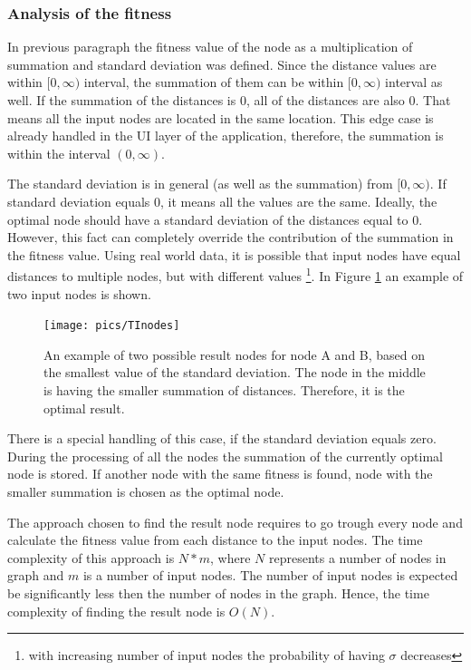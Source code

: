 \documentclass[thesis=M,english]{FITthesis}[2012/10/20]
\begin{document}
\subsubsection{Analysis of the fitness}
In previous paragraph the fitness value of the node as a multiplication of summation and standard deviation was defined. Since the distance values are within $[0, \infty)$ interval, the summation of them can be within $[0, \infty)$ interval as well. If the summation of the distances is $0$, all of the distances are also $0$. That means all the input nodes are located in the same location. This edge case is already handled in the UI layer of the application, therefore, the summation is within the interval $(0, \infty)$.

The standard deviation is in general (as well as the summation) from $[0, \infty)$. If standard deviation equals $0$, it means all the values are the same. Ideally, the optimal node should have a standard deviation of the distances equal to $0$. However, this fact can completely override the contribution of the summation in the fitness value. Using real world data, it is possible that input nodes have equal distances to multiple nodes, but with different values \footnote{with increasing number of input nodes the probability of having $\sigma$ decreases}. In Figure \ref{fig:TInodes} an example of two input nodes is shown.



\begin{figure}[H]
\centering
\texttt{[image: pics/TInodes]}
\caption{An example of two possible result nodes for node A and B, based on the smallest value of the standard deviation. The node in the middle is having the smaller summation of distances. Therefore, it is the optimal result.}
\label{fig:TInodes}
\end{figure}


There is a special handling of this case, if the standard deviation equals zero. During the processing of all the nodes the summation of the currently optimal node is stored. If another node with the same fitness is found, node with the smaller summation is chosen as the optimal node. 


The approach chosen to find the result node requires to go trough every node and calculate the fitness value from each distance to the input nodes. The time complexity of this approach is $N * m$, where $N$ represents a number of nodes in graph and $m$ is a number of input nodes. The number of input nodes is expected be significantly less then the number of nodes in the graph. Hence, the time complexity of finding the result node is $O(N)$. 
\end{document}

